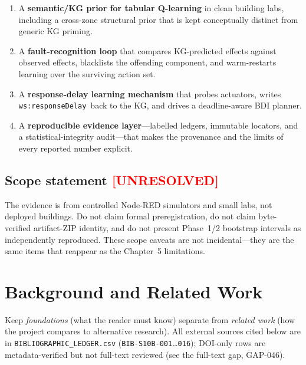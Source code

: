 \documentclass[12pt, a4paper, oneside]{memoir}
\newcommand{\evUnresolved}{\textcolor{red}{[UNRESOLVED]}}
\newcommand{\wsRD}{\texttt{ws:responseDelay}}
\begin{document}
\begin{enumerate}
  \item A \textbf{semantic/KG prior for tabular Q-learning} in clean
        building labs, including a cross-zone structural prior that is kept
        conceptually distinct from generic KG priming.

  \item A \textbf{fault-recognition loop} that compares KG-predicted effects
        against observed effects, blacklists the offending component, and
        warm-restarts learning over the surviving action set.

  \item A \textbf{response-delay learning mechanism} that probes actuators,
        writes \wsRD\ back to the KG, and drives a deadline-aware BDI
        planner.

  \item A \textbf{reproducible evidence layer}---labelled ledgers, immutable
        locators, and a statistical-integrity audit---that makes the
        provenance and the limits of every reported number explicit.
\end{enumerate}

\section{Scope statement \evUnresolved}
\label{sec:intro-scope}

The evidence is from controlled Node-RED simulators and small labs, not
deployed buildings.  Do not claim formal preregistration, do not claim
byte-verified artifact-ZIP identity, and do not present Phase~1/2 bootstrap
intervals as independently reproduced.  These scope caveats are not
incidental---they are the same items that reappear as the Chapter~5
limitations.

\chapter{Background and Related Work}
\label{ch:background}

Keep \emph{foundations} (what the reader must know) separate from
\emph{related work} (how the project compares to alternative research).  All
external sources cited below are in \texttt{BIBLIOGRAPHIC\_LEDGER.csv}
(\texttt{BIB-S10B-001}\ldots\texttt{016}); DOI-only rows are
metadata-verified but not full-text reviewed (see the full-text gap,
GAP-046).
\end{document}
